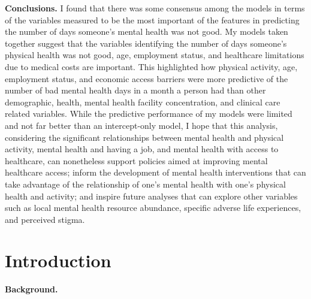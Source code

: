 \documentclass[
]{article}
\begin{document}
\textbf{Conclusions.} I found that there was some consensus among the models in terms of the variables measured to be the most important of the features in predicting the number of days someone's mental health was not good. My models taken together suggest that the variables identifying the number of days someone's physical health was not good, age, employment status, and healthcare limitations due to medical costs are important. This highlighted how physical activity, age, employment status, and economic access barriers were more predictive of the number of bad mental health days in a month a person had than other demographic, health, mental health facility concentration, and clinical care related variables. While the predictive performance of my models were limited and not far better than an intercept-only model, I hope that this analysis, considering the significant relationships between mental health and physical activity, mental health and having a job, and mental health with access to healthcare, can nonetheless support policies aimed at improving mental healthcare access; inform the development of mental health interventions that can take advantage of the relationship of one's mental health with one's physical health and activity; and inspire future analyses that can explore other variables such as local mental health resource abundance, specific adverse life experiences, and perceived stigma.

\hypertarget{introduction}{%
\section{Introduction}\label{introduction}}

\textbf{Background.}
\end{document}
